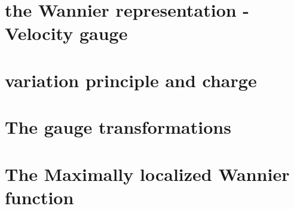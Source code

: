 \documentclass[aps,prb,reprint]{revtex4-1}
\begin{document}
\section{the Wannier representation -Velocity gauge }\cite{Iafrate} 




\newpage

\begin{appendix}
\section{variation principle and charge}
\section{The gauge transformations}
\section{The Maximally localized Wannier function}
\end{appendix}




\end{document}
